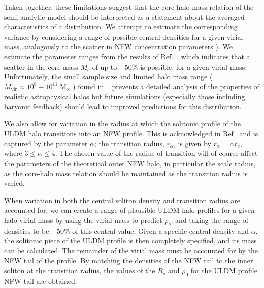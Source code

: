 \documentclass{pasa}%
\begin{document}
Taken together, these limitations suggest that the core-halo mass relation of the semi-analytic model should  be interpreted as a statement about the averaged characteristics of a  distribution. We attempt to estimate the corresponding variance by   considering a range of possible central densities for a given virial mass,  analogously to the scatter in NFW concentration parameters \cite{Maccio:2008pcd}). We estimate the parameter ranges from the results of Ref.~\cite{Schive:2014hza}, which indicates that   a scatter  in the core mass $M_c$ of up to $\pm 50\%$ is possible, for a given virial mass. Unfortunately, the small sample size and limited halo mass range ($ M_{\mathrm{vir}} \approx 10^8-10^{11} \operatorname{M}_{\odot}$) found in ~\cite{Schive:2014hza}  prevents a detailed analysis of the properties of realistic astrophysical halos  but  future simulations (especially those including baryonic feedback) should lead to improved predictions for this distribution. 

We also allow for variation in the radius at which the solitonic profile of the ULDM halo transitions into an NFW profile. This is acknowledged in Ref~\cite{Robles:2018fur} and is captured by the parameter $\alpha$; the transition radius, $r_{\alpha}$, is given by $r_{\alpha} = \alpha r_c$, where $3 \leq \alpha \leq 4$. The chosen value of the radius of transition will of course affect the parameters of the theoretical outer NFW halo, in particular the scale radius, as the core-halo mass relation should be maintained as the transition radius is varied.

When variation in both the central soliton density and  transition radius are accounted for, we can create a range of plausible ULDM halo profiles for a given halo virial mass by using the virial mass to predict $\rho_c$, and taking the range of densities to be $\pm 50\% $ of this central value. Given a specific central density and $\alpha$, the solitonic piece of the ULDM profile is then completely specified, and its mass can be calculated. The remainder of the virial mass must be accounted for by the NFW tail of the profile. By matching the densities of the NFW tail to the inner soliton at the transition radius, the values of the $R_s$ and $\rho_0$ for the ULDM profile NFW tail are obtained.  

\end{document}
